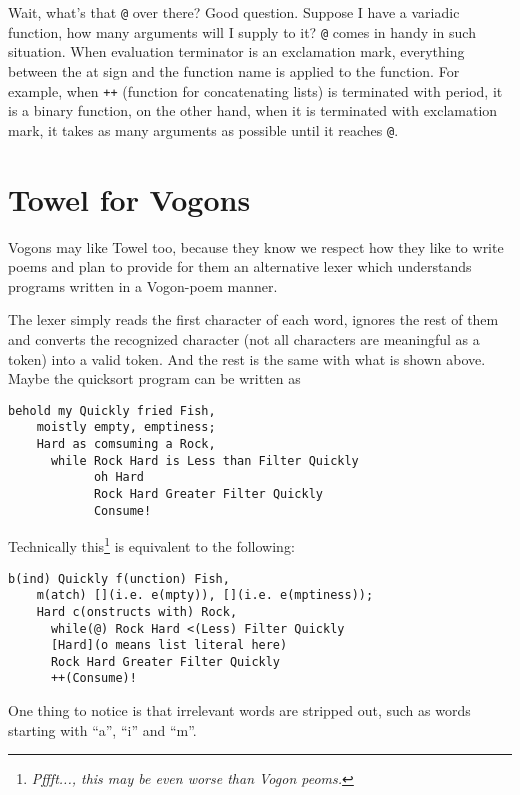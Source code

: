 \documentclass{article}
\begin{document}
Wait, what's that \texttt{@} over there? Good question. Suppose I have a variadic function, how many arguments will I supply to it? \texttt{@} comes in handy in such situation. When evaluation terminator is an exclamation mark, everything between the at sign and the function name is applied to the function. For example, when \texttt{++} (function for concatenating lists) is terminated with period, it is a binary function, on the other hand, when it is terminated with exclamation mark, it takes as many arguments as possible until it reaches \texttt{@}.

\section{Towel for Vogons}

Vogons may like Towel too, because they know we respect how they like to write poems and plan to provide for them an alternative lexer which understands programs written in a Vogon-poem manner.

The lexer simply reads the first character of each word, ignores the rest of them and converts the recognized character (not all characters are meaningful as a token) into a valid token. And the rest is the same with what is shown above.\\

Maybe the quicksort program can be written as

\begin{Verbatim}[samepage=true]
  behold my Quickly fried Fish,
    moistly empty, emptiness;
    Hard as comsuming a Rock,
      while Rock Hard is Less than Filter Quickly
            oh Hard
            Rock Hard Greater Filter Quickly
            Consume!
\end{Verbatim}


Technically this\footnote{\textit{Pffft..., this may be even worse than Vogon peoms.}} is equivalent to the following:

\begin{Verbatim}[samepage=true]
  b(ind) Quickly f(unction) Fish,
    m(atch) [](i.e. e(mpty)), [](i.e. e(mptiness));
    Hard c(onstructs with) Rock,
      while(@) Rock Hard <(Less) Filter Quickly
      [Hard](o means list literal here)
      Rock Hard Greater Filter Quickly
      ++(Consume)!
\end{Verbatim}

One thing to notice is that irrelevant words are stripped out, such as words starting with ``a'', ``i'' and ``m''.\\
\end{document}
